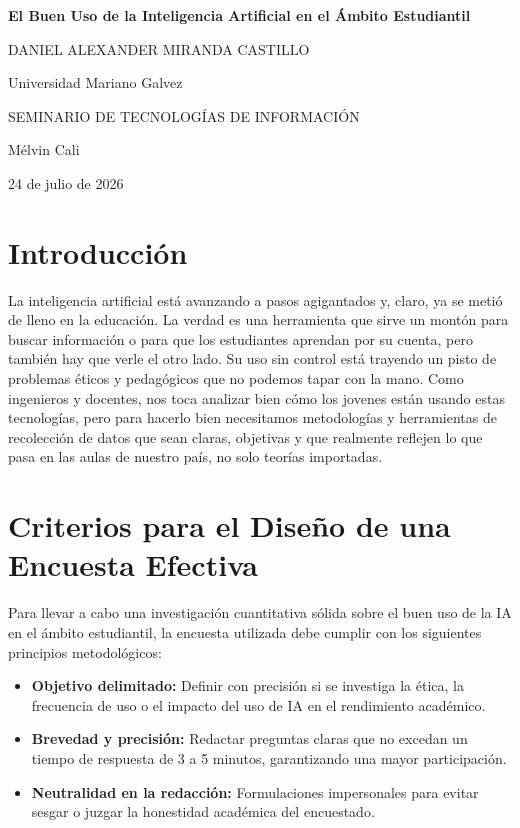 \documentclass[12pt, letterpaper]{article}
\begin{document}
\begin{titlepage}
    \centering
    \vspace*{2cm}
    
    {\Large \bfseries El Buen Uso de la Inteligencia Artificial en el Ámbito Estudiantil\par}
    
    \vspace{2cm}
    
    {\large DANIEL ALEXANDER MIRANDA CASTILLO \par}
    \vspace{0.5cm}
    {\large Universidad Mariano Galvez \par}
    {\large SEMINARIO DE TECNOLOGÍAS DE INFORMACIÓN \par}
    {\large Mélvin Cali\par}
    \vspace{1cm}
    {\large 24 de julio de 2026 \par}
    
    \vfill
\end{titlepage}

\section*{Introducción}
La inteligencia artificial está avanzando a pasos agigantados y, claro, ya se metió de lleno en la educación. La verdad es una herramienta que sirve un montón para buscar información o para que los estudiantes aprendan por su cuenta, pero también hay que verle el otro lado. Su uso sin control está trayendo un pisto de problemas éticos y pedagógicos que no podemos tapar con la mano. Como ingenieros y docentes, nos toca analizar bien cómo los jovenes están usando estas tecnologías, pero para hacerlo bien necesitamos metodologías y herramientas de recolección de datos que sean claras, objetivas y que realmente reflejen lo que pasa en las aulas de nuestro país, no solo teorías importadas.

\section*{Criterios para el Diseño de una Encuesta Efectiva}
Para llevar a cabo una investigación cuantitativa sólida sobre el buen uso de la IA en el ámbito estudiantil, la encuesta utilizada debe cumplir con los siguientes principios metodológicos:

\begin{itemize}
    \item \textbf{Objetivo delimitado:} Definir con precisión si se investiga la ética, la frecuencia de uso o el impacto del uso de IA en el rendimiento académico.
    \item \textbf{Brevedad y precisión:} Redactar preguntas claras que no excedan un tiempo de respuesta de 3 a 5 minutos, garantizando una mayor participación.
    \item \textbf{Neutralidad en la redacción:} Formulaciones impersonales para evitar sesgar o juzgar la honestidad académica del encuestado.
   
\end{itemize}
\end{document}
